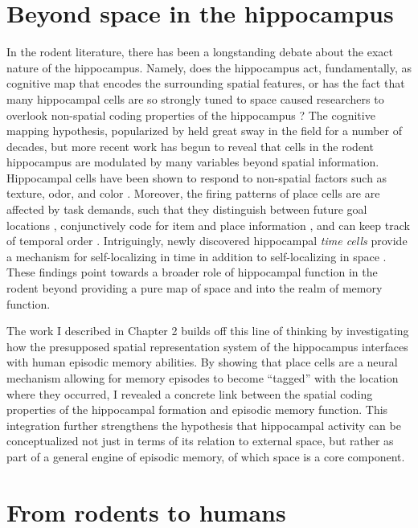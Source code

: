 \section{Beyond space in the hippocampus}
In the rodent literature, there has been a longstanding debate about the exact nature of the hippocampus. Namely, does the hippocampus act, fundamentally, as cognitive map that encodes the surrounding spatial features, or has the fact that many hippocampal cells are so strongly tuned to space caused researchers to overlook non-spatial coding properties of the hippocampus \citep{EichEtal99}? The cognitive mapping hypothesis, popularized by \citet{OKeeNade78} held great sway in the field for a number of decades, but more recent work has begun to reveal that cells in the rodent hippocampus are modulated by many variables beyond spatial information. Hippocampal cells have been shown to respond to non-spatial factors such as texture, odor, and color \citep{YounEtal94,WoodEtal99,LeutEtal05,IgarEtal14}. Moreover, the firing patterns of place cells are are affected by task demands, such that they distinguish between future goal locations \citep{WoodEtal00,FerbShap03}, conjunctively code for item and place information \citep{KomoEtal09}, and can keep track of temporal order \citep{MannEtal07}. Intriguingly, newly discovered hippocampal \textit{time cells} provide a mechanism for self-localizing in time in addition to self-localizing in space \citep{MacDEtal11,KrauEtal13}. These findings point towards a broader role of hippocampal function in the rodent beyond providing a pure map of space and into the realm of memory function.

The work I described in Chapter 2 builds off this line of thinking by investigating how the presupposed spatial representation system of the hippocampus interfaces with human episodic memory abilities. By showing that place cells are a neural mechanism allowing for memory episodes to become ``tagged'' with the location where they occurred, I revealed a concrete link between the spatial coding properties of the hippocampal formation and episodic memory function. This integration further strengthens the hypothesis that hippocampal activity can be conceptualized not just in terms of its relation to external space, but rather as part of a general engine of episodic memory, of which space is a core component.

\section{From rodents to humans}

